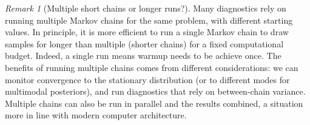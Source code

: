\documentclass[
  11pt,
  letterpaper,
]{scrbook}
\theoremstyle{definition}
\theoremstyle{plain}
\theoremstyle{plain}
\theoremstyle{plain}
\theoremstyle{definition}
\theoremstyle{definition}
\theoremstyle{plain}
\theoremstyle{plain}
\theoremstyle{remark}
\newtheorem{refremark}{Remark}[chapter]
\begin{document}
\begin{refremark}[Multiple short chains or longer runs?]
Many diagnostics rely on running multiple Markov chains for the same
problem, with different starting values. In principle, it is more
efficient to run a single Markov chain to draw samples for longer than
multiple (shorter chains) for a fixed computational budget. Indeed, a
single run means warmup needs to be achieve once. The benefits of
running multiple chains comes from different considerations: we can
monitor convergence to the stationary distribution (or to different
modes for multimodal posteriors), and run diagnostics that rely on
between-chain variance. Multiple chains can also be run in parallel and
the results combined, a situation more in line with modern computer
architecture.

\label{rem-short-vs-long}

\end{refremark}
\end{document}
